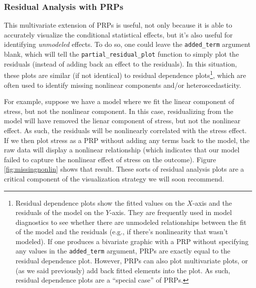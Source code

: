 \documentclass[
  man,floatsintext]{apa6}
\begin{document}
\subsubsection{Residual Analysis with PRPs}\label{residual-analysis-with-prps}

This multivariate extension of PRPs is useful, not only because it is able to accurately visualize the conditional statistical effects, but it's also useful for identifying \emph{unmodeled} effects. To do so, one could leave the \texttt{added\_term} argument blank, which will tell the \texttt{partial\_residual\_plot} function to simply plot the residuals (instead of adding back an effect to the residuals). In this situation, these plots are similar (if not identical) to residual dependence plots\footnote{Residual dependence plots show the fitted values on the \(X\)-axis and the residuals of the model on the \(Y\)-axis. They are frequently used in model diagnostics to see whether there are unmodeled relationships between the fit of the model and the residuals (e.g., if there's nonlinearity that wasn't modeled). If one produces a bivariate graphic with a PRP without specifying any values in the \texttt{added\_term} argument, PRPs are exactly equal to the residual dependence plot. However, PRPs can also plot multivariate plots, or (as we said previously) add back fitted elements into the plot. As such, residual dependence plots are a ``special case'' of PRPs.}, which are often used to identify missing nonlinear components and/or heteroscedasticity.

For example, suppose we have a model where we fit the linear component of stress, but not the nonlinear component. In this case, residualizing from the model will have removed the lienar component of stress, but not the nonlinear effect. As such, the residuals will be nonlinearly correlated with the stress effect. If we then plot stress as a PRP without adding any terms back to the model, the raw data will display a nonlinear relationship (which indicates that our model failed to capture the nonlinear effect of stress on the outcome). Figure \ref{fig:missingnonlin} shows that result. These sorts of residual analysis plots are a critical component of the visualization strategy we will soon recommend.
\end{document}
